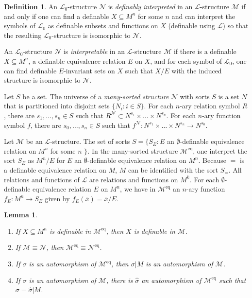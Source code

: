\documentclass{amsart}
\newtheorem{lemma}[theorem]{Lemma}
\theoremstyle{definition}
\newtheorem{definition}[theorem]{Definition}
\numberwithin{equation}{section}
\begin{document}
\begin{definition}
    An $\mathcal{L}_0$-structure $\mathcal{N}$ is \emph{definably interpreted} in an $\mathcal{L}$-structure $\mathcal{M}$ 
    if and only if one can find a definable $X \subseteq M^n$ for some $n$ and can interpret the symbols of $\mathcal{L}_0$
    as definable subsets and functions on $X$ (definable using $\mathcal{L}$)
    so that the resulting $\mathcal{L}_0$-structure is isomorphic to $\mathcal{N}$.

    An $\mathcal{L}_0$-structure $\mathcal{N}$ is \emph{interpretable} in an $\mathcal{L}$-structure $\mathcal{M}$
    if there is a definable $X \subseteq M^n$, a definable equivalence relation $E$ on $X$,
    and for each symbol of $\mathcal{L}_0$, one can find definable $E$-invariant sets on $X$
    such that $X / E$ with the induced structure is isomorphic to $\mathcal{N}$.
\end{definition}

Let $S$ be a set.
The universe of a \emph{many-sorted structure} $\mathcal{N}$ with sorts $S$ is 
a set $N$ that is partitioned into disjoint sets $\{N_i : i \in S\}$.
For each $n$-ary relation symbol $R$,
there are $s_1,\dots,s_n \in S$ such that $R^{\mathcal{N}} \subset N^{s_1} \times \dots \times N^{s_n}$.
For each $n$-ary function symbol $f$,
there are $s_0,\dots,s_n \in S$ such that $f^{\mathcal{N}} : N^{s_1} \times \dots \times N^{s_n} \to N^{s_0}$.

Let $\mathcal{M}$ be an $\mathcal{L}$-structure.
The set of sorts $S = \{S_E : E$ an $\emptyset$-definable equivalence relation on $M^n$ for some $n$ $\}$.
In the many-sorted structure $\mathcal{M}^{\mathrm{eq}}$,
one interpret the sort $S_E$ as $M^n / E$ for $E$ an $\emptyset$-definable equivalence relation on $M^n$.
Because $=$ is a definable equivalence relation on $M$,
$M$ can be identified with the sort $S_{=}$.
All relations and functions of $\mathcal{L}$ are relations and functions on $M^k$.
For each $\emptyset$-definable equivalence relation $E$ on $M^n$,
we have in $\mathcal{M}^{\mathrm{eq}}$ an $n$-ary function $f_E: M^n \to S_E$ given by $f_E(\overline{x}) = \overline{x} / E$.

\begin{lemma}
    \begin{enumerate}[label = {\roman*)}]
        \item If $X \subseteq M^n$ is definable in $\mathcal{M}^{\mathrm{eq}}$, then $X$ is definable in $\mathcal{M}$.
        \item If $\mathcal{M} \equiv \mathcal{N}$, then $\mathcal{M}^{\mathrm{eq}} \equiv \mathcal{N}^{\mathrm{eq}}$.
        \item If $\sigma$ is an automorphism of $\mathcal{M}^{\mathrm{eq}}$, then $\sigma|M$ is an automorphism of $\mathcal{M}$.
        \item If $\sigma$ is an automorphism of $\mathcal{M}$,
          there is $\widehat{\sigma}$ an automorphism of $\mathcal{M}^{\mathrm{eq}}$ such that $\sigma = \widehat{\sigma}|M$.
    \end{enumerate}
\end{lemma}
\end{document}
